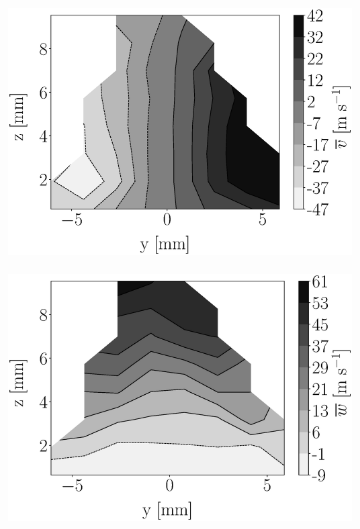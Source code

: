 \begin{figure}[h!]
\begin{subfigure}[b]{0.22\textwidth}
\end{subfigure}
   \hspace{0.17in}
\begin{subfigure}[b]{0.22\textwidth}
	\centering
   \includegraphics[scale=0.17]{./part2_developments/figures_ch5_resolved_JICF/injectors_SLI/uG100_dx10_x10_uy_mean_map.eps}
\end{subfigure}
   \hspace{0.17in}
\begin{subfigure}[b]{0.22\textwidth}
	\centering
   \includegraphics[scale=0.17]{./part2_developments/figures_ch5_resolved_JICF/injectors_SLI/uG100_dx10_x10_uz_mean_map.eps}
\end{subfigure}


\end{figure}
